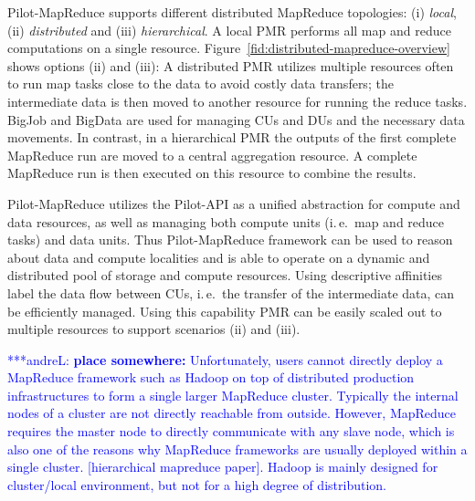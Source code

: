 \documentclass{acm_proc_article-sp}
\newcommand{\jhanote}[1]{ {\textcolor{red} { ***SJ: #1 }}}
\newcommand{\alnote}[1]{ {\textcolor{blue} { ***andreL: #1 }}}
\newcommand{\alnote}[1]{}
\newcommand{\jhanote}[1]{}
\newcommand{\pilotmapreduce}{Pilot-MapReduce\xspace}
\begin{document}
\pilotmapreduce supports different distributed MapReduce topologies:
(i) \emph{local}, (ii) \emph{distributed} and (iii)
\emph{hierarchical}. A local PMR performs all map and reduce
computations on a single resource.
Figure~\ref{fid:distributed-mapreduce-overview} shows options (ii) and
(iii): A distributed PMR utilizes multiple resources often to run map
tasks close to the data to avoid costly data transfers; the
intermediate data is then moved to another resource for running the
reduce tasks. BigJob and BigData are used for managing CUs and DUs and
the necessary data movements. In contrast, in a hierarchical PMR the
outputs of the first complete MapReduce run are moved to a central
aggregation resource. A complete MapReduce run is then executed on
this resource to combine the results. %


\pilotmapreduce utilizes the Pilot-API as a unified abstraction for
compute and data resources, as well as managing both compute units
(i.\,e.\ map and reduce tasks) and data units.  Thus \pilotmapreduce
framework can be used to reason about data and compute localities and
is able to operate on a dynamic and distributed pool of storage and
compute resources.  Using descriptive affinities label the data flow
between CUs, i.\,e.\ the transfer of the intermediate data, can be
efficiently managed. Using this capability PMR can be easily scaled
out to multiple resources to support scenarios (ii) and (iii).



\alnote{\textbf{place somewhere:} Unfortunately, users cannot directly
  deploy a MapReduce framework such as Hadoop on top of distributed
  production infrastructures to form a single larger MapReduce
  cluster. Typically the internal nodes of a cluster are not directly
  reachable from outside. However, MapReduce requires the master node
  to directly communicate with any slave node, which is also one of
  the reasons why MapReduce frameworks are usually deployed within a
  single cluster. [hierarchical mapreduce paper]. Hadoop is mainly
  designed for cluster/local environment, but not for a high degree of
  distribution.}
\end{document}
